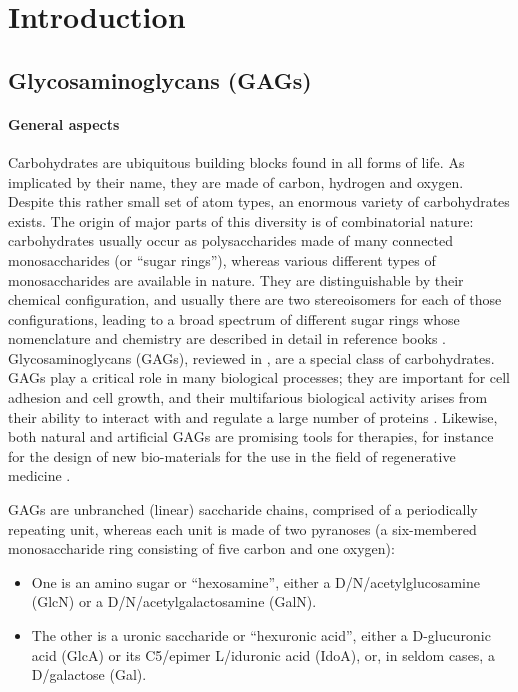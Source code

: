 \chapter{Introduction}
\label{background}

\section{Glycosaminoglycans (GAGs)}
\label{background:gags}


\subsubsection{General aspects}%
Carbohydrates are ubiquitous building blocks found in all forms of life. As
implicated by their name, they are made of carbon, hydrogen and oxygen. Despite
this rather small set of atom types, an enormous variety of carbohydrates
exists. The origin of major parts of this diversity is of combinatorial nature:
carbohydrates usually occur as polysaccharides made of many connected
monosaccharides (or \enquote{sugar rings}), whereas various different types of
monosaccharides are available in nature. They are distinguishable by their
chemical configuration, and usually there are two stereoisomers for each of
those configurations, leading to a broad spectrum of different sugar rings whose
nomenclature and chemistry are described in detail in reference books
\cite{carbohydrate_chemistry_robyt_1998, carbohydrate_chemistry_royal_2000}.
Glycosaminoglycans (GAGs), reviewed in
\cite{essentials_glycobiology_gags_chapter_2009}, are a special class of
carbohydrates. GAGs play a critical role in many biological processes; they are
important for cell adhesion and cell growth, and their multifarious biological
activity arises from their ability to interact with and regulate a large number
of proteins \cite{handel_2005,gandhi_structure_2008}. Likewise, both natural and
artificial GAGs are promising tools for therapies, for instance for the design
of new bio-materials for the use in the field of regenerative medicine
\cite{whitelock_2014,schnabelrauch_tissues_2013,scott_gags_therapies_2013}.

GAGs are unbranched (linear) saccharide chains, comprised of a periodically
repeating unit, whereas each unit is made of two pyranoses (a six-membered
monosaccharide ring consisting of five carbon and one oxygen):


\begin{itemize}
\item One is an amino sugar or \enquote{hexosamine}, either a
D\-/N\-/acetylglucosamine (GlcN) or a D\-/N\-/acetylgalactosamine (GalN).
\item The other is a uronic saccharide or \enquote{hexuronic acid}, either a
D-glucuronic acid (GlcA) or its C5\-/epimer L\-/iduronic acid (IdoA), or, in
seldom cases, a D\-/galactose (Gal).
\end{itemize}


